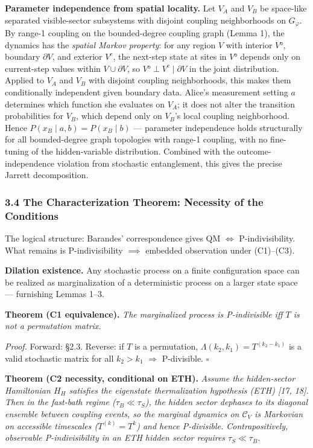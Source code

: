 \documentclass[
]{article}
\begin{document}
\textbf{Parameter independence from spatial locality.} Let \(V_A\) and
\(V_B\) be space-like separated visible-sector subsystems with disjoint
coupling neighborhoods on \(G_\varphi\). By range-1 coupling on the
bounded-degree coupling graph (Lemma 1), the dynamics has the
\emph{spatial Markov property}: for any region \(V\) with interior
\(V°\), boundary \(\partial V\), and exterior \(V^c\), the next-step
state at sites in \(V°\) depends only on current-step values within
\(V \cup \partial V\), so \(V° \perp V^c \mid \partial V\) in the joint
distribution. Applied to \(V_A\) and \(V_B\) with disjoint coupling
neighborhoods, this makes them conditionally independent given boundary
data. Alice's measurement setting \(a\) determines which function she
evaluates on \(V_A\); it does not alter the transition probabilities for
\(V_B\), which depend only on \(V_B\)'s local coupling neighborhood.
Hence \(P(x_B \mid a, b) = P(x_B \mid b)\) --- parameter independence
holds structurally for all bounded-degree graph topologies with range-1
coupling, with no fine-tuning of the hidden-variable distribution.
Combined with the outcome-independence violation from stochastic
entanglement, this gives the precise Jarrett decomposition.

\hypertarget{the-characterization-theorem-necessity-of-the-conditions}{%
\subsubsection{3.4 The Characterization Theorem: Necessity of the
Conditions}\label{the-characterization-theorem-necessity-of-the-conditions}}

The logical structure: Barandes' correspondence gives QM \(\iff\)
P-indivisibility. What remains is P-indivisibility \(\implies\) embedded
observation under (C1)--(C3).

\textbf{Dilation existence.} Any stochastic process on a finite
configuration space can be realized as marginalization of a
deterministic process on a larger state space --- furnishing Lemmas
1--3.

\textbf{Theorem (C1 equivalence).} \emph{The marginalized process is
P-indivisible iff \(T\) is not a permutation matrix.}

\emph{Proof.} Forward: §2.3. Reverse: if \(T\) is a permutation,
\(\Lambda(k_2, k_1) = T^{(k_2-k_1)}\) is a valid stochastic matrix for
all \(k_2 > k_1\) \(\Rightarrow\) P-divisible. \(\square\)

\textbf{Theorem (C2 necessity, conditional on ETH).} \emph{Assume the
hidden-sector Hamiltonian \(H_H\) satisfies the eigenstate
thermalization hypothesis (ETH) {[}17, 18{]}. Then in the fast-bath
regime (\(\tau_B \ll \tau_S\)), the hidden sector dephases to its
diagonal ensemble between coupling events, so the marginal dynamics on
\(\mathcal{C}_V\) is Markovian on accessible timescales
(\(T^{(k)} = T^k\)) and hence P-divisible. Contrapositively, observable
P-indivisibility in an ETH hidden sector requires
\(\tau_S \ll \tau_B\).}
\end{document}
